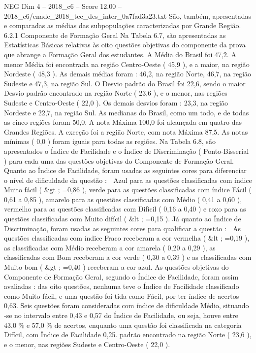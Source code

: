 \begin{textsample}{NEG Dim 4 – 2018\_c6 – Score 12.00 – 2018\_c6/enade\_2018\_tec\_des\_inter\_0a7fad3a23.txt}
São, também, apresentadas e comparadas as médias das subpopulações caracterizadas por Grande Região. 6.2.1 Componente de Formação Geral Na Tabela 6.7, são apresentadas as Estatísticas Básicas relativas às oito questões objetivas do componente da prova que abrange a Formação Geral dos estudantes.
A Média do Brasil foi 47,2.
A menor Média foi encontrada na região Centro-Oeste ( 45,9 ), e a maior, na região Nordeste ( 48,3 ).
As demais médias foram : 46,2, na região Norte, 46,7, na região Sudeste e 47,3, na região Sul.
O Desvio padrão do Brasil foi 22,6, sendo o maior Desvio padrão encontrado na região Norte ( 23,6 ), e o menor, nas regiões Sudeste e Centro-Oeste ( 22,0 ).
Os demais desvios foram : 23,3, na região Nordeste e 22,7, na região Sul.
As medianas do Brasil, como um todo, e de todas as cinco regiões foram 50,0.
A nota Máxima 100,0 foi alcançada em quatro das Grandes Regiões.
A exceção foi a região Norte, com nota Máxima 87,5.
As notas mínimas ( 0,0 ) foram iguais para todas as regiões.
Na Tabela 6.8, são apresentados o Índice de Facilidade e o Índice de Discriminação ( Ponto-Bisserial ) para cada uma das questões objetivas do Componente de Formação Geral.
Quanto ao Índice de Facilidade, foram usadas as seguintes cores para diferenciar o nível de dificuldade da questão :  Azul para as questões classificadas com índice Muito fácil ( \&gt ; =0,86 ), verde para as questões classificadas com índice Fácil ( 0,61 a 0,85 ), amarelo para as questões classificadas com Médio ( 0,41 a 0,60 ), vermelho para as questões classificadas com Difícil ( 0,16 a 0,40 ) e roxo para as questões classificadas com Muito difícil ( \&lt ; =0,15 ).
Já quanto ao Índice de Discriminação, foram usadas as seguintes cores para qualificar a questão :  As questões classificadas com índice Fraco receberam a cor vermelha ( \&lt ; =0,19 ), as classificadas com Médio receberam a cor amarela ( 0,20 a 0,29 ), as classificadas com Bom receberam a cor verde ( 0,30 a 0,39 ) e as classificadas com Muito bom ( \&gt ; =0,40 ) receberam a cor azul.
As questões objetivas do Componente de Formação Geral, segundo o Índice de Facilidade, foram assim avaliadas : das oito questões, nenhuma teve o Índice de Facilidade classificado como Muito fácil, e uma questão foi tida como Fácil, por ter índice de acertos 0,63.
Seis questões foram consideradas com índice de dificuldade Médio, situando -se no intervalo entre 0,43 e 0,57 do Índice de Facilidade, ou seja, houve entre 43,0 \% e 57,0 \% de acertos, enquanto uma questão foi classificada na categoria Difícil, com Índice de Facilidade 0,25. padrão encontrado na região Norte ( 23,6 ), e o menor, nas regiões Sudeste e Centro-Oeste ( 22,0 ).

\end{textsample}
